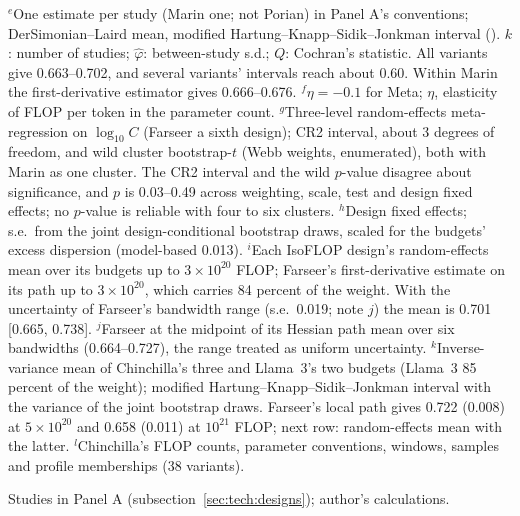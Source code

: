 \begin{table}[tp]
\begin{tablenotes}
$^{e}$One estimate per study (Marin one; not Porian) in Panel A's conventions; DerSimonian--Laird mean, modified
Hartung--Knapp--Sidik--Jonkman interval (\citealp{knapp2003improved}). $k$: number of studies; $\hat\varphi$:
between-study s.d.; $Q$: Cochran's statistic. All variants give 0.663--0.702, and several variants' intervals reach about
0.60. Within Marin the first-derivative estimator gives 0.666--0.676.
$^{f}$$\eta=-0.1$ for Meta; $\eta$, elasticity of FLOP per token in the parameter count.
$^{g}$Three-level random-effects meta-regression on $\log_{10}C$ (Farseer a sixth design); CR2 interval, about 3
degrees of freedom, and wild cluster bootstrap-$t$ (Webb weights, enumerated), both with Marin as one cluster. The CR2
interval and the wild $p$-value disagree about significance, and $p$ is 0.03--0.49 across weighting, scale, test and
design fixed effects; no $p$-value is reliable with four to six clusters.
$^{h}$Design fixed effects; s.e.\ from the joint design-conditional bootstrap draws, scaled for the budgets' excess
dispersion (model-based 0.013).
$^{i}$Each IsoFLOP design's random-effects mean over its budgets up to $3\times10^{20}$ FLOP; Farseer's first-derivative
estimate on its path up to $3\times10^{20}$, which carries 84 percent of the weight. With the uncertainty of
Farseer's bandwidth range (s.e.\ 0.019; note $j$) the mean is 0.701 [0.665, 0.738].
$^{j}$Farseer at the midpoint of its Hessian path mean over six bandwidths (0.664--0.727), the range treated as uniform
uncertainty.
$^{k}$Inverse-variance mean of Chinchilla's three and Llama~3's two budgets (Llama~3 85 percent of the weight);
modified Hartung--Knapp--Sidik--Jonkman interval with the variance of the joint bootstrap draws. Farseer's local path
gives 0.722 (0.008) at $5\times10^{20}$ and 0.658 (0.011) at $10^{21}$ FLOP; next row: random-effects mean with the
latter.
$^{l}$Chinchilla's FLOP counts, parameter conventions, windows, samples and profile memberships (38 variants).
\end{tablenotes}

\begin{tablenotes}[Source]
Studies in Panel A (subsection~\ref{sec:tech:designs}); author's calculations.
\end{tablenotes}
\end{table}
